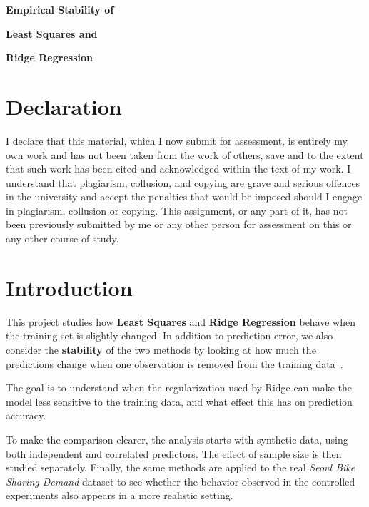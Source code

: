 \documentclass[11pt,a4paper]{article}
\begin{document}
\begin{titlepage}
    \centering
    \vspace*{0.28\textheight}

    {\LARGE\bfseries Empirical Stability of \par}
    {\LARGE\bfseries Least Squares and \par}
    {\LARGE\bfseries Ridge Regression\par}

    \vspace{1.5cm}

    \vfill
\end{titlepage}

\section*{Declaration}

I declare that this material, which I now submit for assessment, is entirely my own work and has not been taken from the work of others, save and to the extent that such work has been cited and acknowledged within the text of my work. I understand that plagiarism, collusion, and copying are grave and serious offences in the university and accept the penalties that would be imposed should I engage in plagiarism, collusion or copying. This assignment, or any part of it, has not been previously submitted by me or any other person for assessment on this or any other course of study.

\newpage

\section{Introduction}

This project studies how \textbf{Least Squares} and \textbf{Ridge Regression} behave when the training set is slightly changed. In addition to prediction error, we also consider the \textbf{stability} of the two methods by looking at how much the predictions change when one observation is removed from the training data~\cite{bousquet2002stability}.

The goal is to understand when the regularization used by Ridge can make the model less sensitive to the training data, and what effect this has on prediction accuracy.

To make the comparison clearer, the analysis starts with synthetic data, using both independent and correlated predictors. The effect of sample size is then studied separately. Finally, the same methods are applied to the real \emph{Seoul Bike Sharing Demand} dataset to see whether the behavior observed in the controlled experiments also appears in a more realistic setting.
\end{document}
